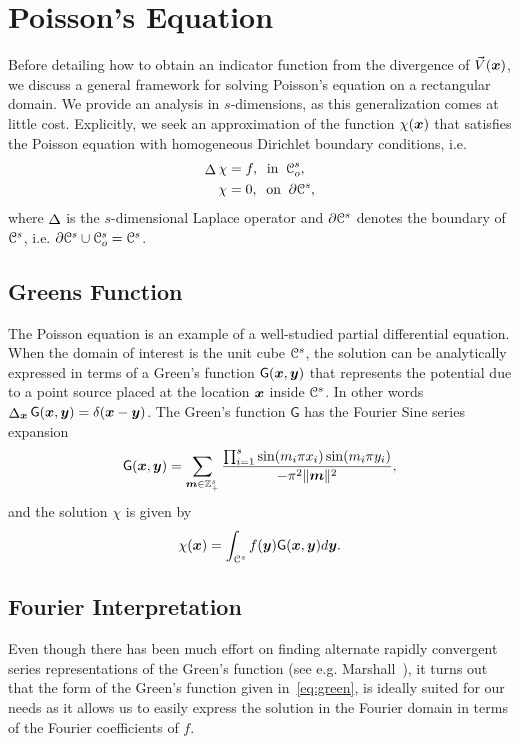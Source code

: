 \section{Poisson's Equation} 
Before detailing how to obtain an indicator function from the divergence of $\vec{V}(\boldsymbol{x})$, we discuss a general framework for solving Poisson's equation on a rectangular domain. 
We provide an analysis in $s$-dimensions, as this generalization comes at little cost.
Explicitly, we seek an approximation of the function $\chi(\boldsymbol{x})$ that satisfies the Poisson equation with homogeneous Dirichlet boundary conditions, i.e. 
\begin{equation} \label{eq:PoissonEquation}
	\begin{split}
		\laplacian{\chi} &= f, \;\; \text{in} \;\; \oucube^s, \\
		\chi &= 0, \;\; \text{on} \;\; \partial \ucube^s,
	\end{split}
\end{equation}
where $\mathop{\Delta}$ is the $s$-dimensional Laplace operator and $\partial \mathcal{C}^s$ denotes the boundary of $\mathcal{C}^s$, i.e. $\partial \mathcal{C}^s \cup \mathcal{C}_o^s = \mathcal{C}^s$.

\subsection{Greens Function}
The Poisson equation is an example of a well-studied partial differential equation. 
When the domain of interest is the unit cube $\mathcal{C}^s$, the solution can be analytically expressed in terms of a Green's function $\mathsf{G}(\boldsymbol{x},\boldsymbol{y})$ that represents the potential due to a point source placed at the location $\boldsymbol{x}$ inside $\mathcal{C}^s$.  
In other words $\mathop{\Delta}_{\boldsymbol{x}} \mathsf{G}(\boldsymbol{x},\boldsymbol{y}) = \delta(\boldsymbol{x}-\boldsymbol{y})$. The Green's function $\mathsf{G}$ has the Fourier Sine series expansion 
\begin{equation}
	\mathsf{G}(\vect{x},\vect{y}) = \sum_{\vect{m} \in \ints^s_+} 
	\frac{\prod_{i=1}^s \sin(m_i \pi x_i) \sin(m_i \pi y_i)}
	{-\pi^2 \norm{\vect{m}}^2},
	\label{eq:green}
\end{equation}
and the solution $\chi$ is given by
\begin{equation}
	\chi(\vect{x}) = \int_{\ucube^s}f(\vect{y})\mathsf{G}(\vect{x},\vect{y}) d\vect{y}.
	\label{eq:analytic}
\end{equation}


\subsection{Fourier Interpretation}
Even though there has been much effort on finding alternate rapidly convergent series representations of the Green's function (see e.g. Marshall~\cite{marshall99}), it turns out that the form of the Green's function given in~\eqref{eq:green}, is ideally suited for our needs as it allows us to easily express the solution in the Fourier domain in terms of the Fourier coefficients of $f$.

